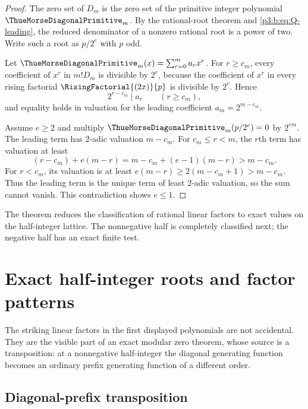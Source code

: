 \documentclass[11pt,oneside]{article}
\numberwithin{equation}{section}
\theoremstyle{definition}
\theoremstyle{remark}
\begin{document}
\begin{proof}
The zero set of $D_m$ is the zero set of the primitive integer polynomial
$\ThueMorseDiagonalPrimitive_m$.  By the rational-root theorem and \eqref{p3:b:eq:Q-leading}, the reduced
denominator of a nonzero rational root is a power of two.  Write such a root
as $p/2^e$ with $p$ odd.

Let $\ThueMorseDiagonalPrimitive_m(x)=\sum_{r=0}^{m}a_rx^r$.  For $r\ge c_m$, every coefficient of
$x^r$ in $m!D_m$ is divisible by $2^r$, because the coefficient of
$x^r$ in every rising factorial $\RisingFactorial{(2x)}{p}$ is divisible by $2^r$.
Hence
\begin{equation}
 2^{r-c_m}\mid a_r\qquad(r\ge c_m),
 \label{p3:b:eq:coefficient-v2-bound}
\end{equation}
and equality holds in valuation for the leading coefficient
$a_m=2^{m-c_m}$.

Assume $e\ge2$ and multiply $\ThueMorseDiagonalPrimitive_m(p/2^e)=0$ by $2^{em}$.  The leading term
has $2$-adic valuation $m-c_m$.  For $c_m\le r<m$, the $r$th term has
valuation at least
\[
 (r-c_m)+e(m-r)
 =m-c_m+(e-1)(m-r)>m-c_m.
\]
For $r<c_m$, its valuation is at least
$e(m-r)\ge2(m-c_m+1)>m-c_m$.  Thus the leading term is the unique term of
least $2$-adic valuation, so the sum cannot vanish.  This contradiction shows
$e\le1$.
\end{proof}

The theorem reduces the classification of rational linear factors to exact
values on the half-integer lattice.  The nonnegative half is completely
classified next; the negative half has an exact finite test.
\section{Exact half-integer roots and factor patterns}\label{p3:ch:roots}


The striking linear factors in the first displayed polynomials are not
accidental. They are the visible part of an exact modular zero theorem,
whose source is a transposition: at a nonnegative half-integer the diagonal
generating function becomes an ordinary prefix generating function of a
different order.

\subsection{Diagonal-prefix transposition}
\end{document}
